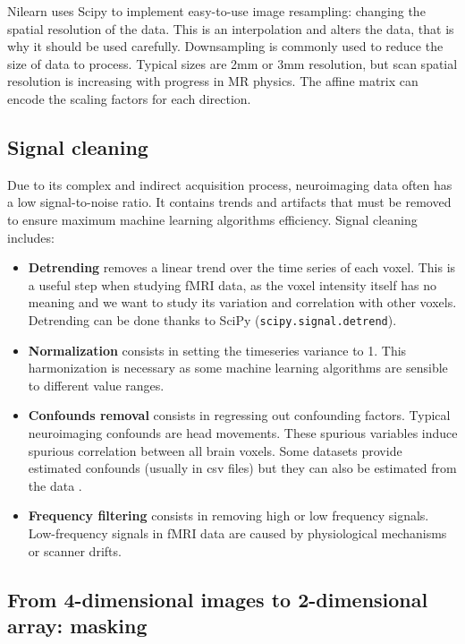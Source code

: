 \documentclass{frontiersSCNS} %
\begin{document}
Nilearn uses Scipy to implement easy-to-use image resampling: 
changing the spatial resolution of the data. This is
an interpolation and alters the data, that is why it should be used carefully.
Downsampling is commonly used to reduce the size of data to process.
Typical sizes are 2mm or 3mm resolution, but scan spatial resolution is
increasing with progress in MR physics. The affine matrix can encode the
scaling factors for each direction.

\subsection{Signal cleaning}

Due to its complex and indirect acquisition process, neuroimaging data often has a low
signal-to-noise ratio. It contains trends and artifacts that must be removed
to ensure maximum machine learning algorithms efficiency. Signal cleaning
includes:
\begin{itemize}
    \item{\bf Detrending} removes a linear trend over the time series of each
        voxel. This is a useful step when studying fMRI data, as the voxel
        intensity itself has no meaning and we want to study its variation and
        correlation with other voxels. Detrending can be done thanks to SciPy
        (\texttt{scipy.signal.detrend}).
    \item{\bf Normalization} consists in setting the timeseries variance to 1.
        This harmonization is necessary as some machine learning algorithms are
        sensible to different value ranges.
    \item{\bf Confounds removal} consists in regressing out confounding factors.
        Typical neuroimaging confounds are head movements. These spurious
        variables induce spurious correlation between all brain voxels.
        Some datasets provide estimated confounds (usually in csv files) but
        they can also be estimated from the data \citep{behzadi2007}.
    \item{\bf Frequency filtering} consists in removing high or low
        frequency signals. Low-frequency signals in fMRI data are caused by
        physiological mechanisms or scanner drifts.
\end{itemize}

\subsection{From 4-dimensional images to 2-dimensional array: masking}
\end{document}
